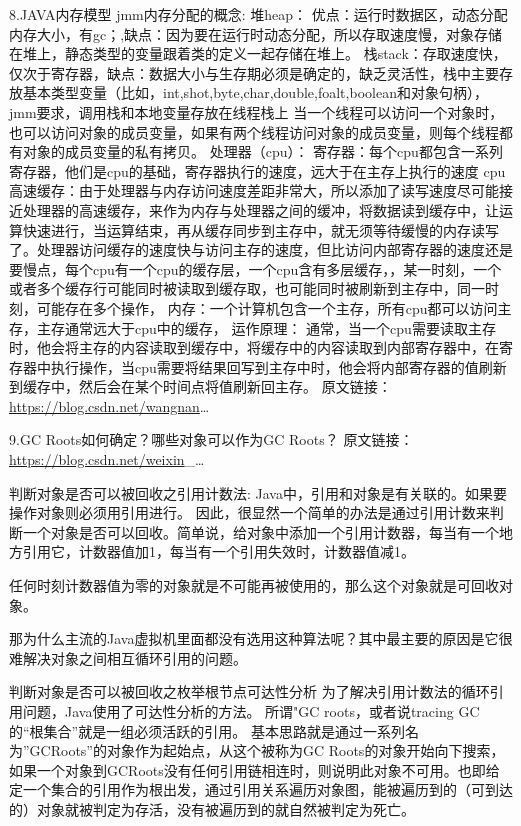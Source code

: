 \documentclass[9pt, b5paper]{article}
\begin{document}
8.JAVA内存模型
jmm内存分配的概念:
堆heap： 优点：运行时数据区，动态分配内存大小，有gc；,缺点：因为要在运行时动态分配，所以存取速度慢，对象存储在堆上，静态类型的变量跟着类的定义一起存储在堆上。
栈stack：存取速度快，仅次于寄存器，缺点：数据大小与生存期必须是确定的，缺乏灵活性，栈中主要存放基本类型变量（比如，int,shot,byte,char,double,foalt,boolean和对象句柄），jmm要求，调用栈和本地变量存放在线程栈上
当一个线程可以访问一个对象时，也可以访问对象的成员变量，如果有两个线程访问对象的成员变量，则每个线程都有对象的成员变量的私有拷贝。
处理器（cpu）： 寄存器：每个cpu都包含一系列寄存器，他们是cpu的基础，寄存器执行的速度，远大于在主存上执行的速度
cpu高速缓存：由于处理器与内存访问速度差距非常大，所以添加了读写速度尽可能接近处理器的高速缓存，来作为内存与处理器之间的缓冲，将数据读到缓存中，让运算快速进行，当运算结束，再从缓存同步到主存中，就无须等待缓慢的内存读写了。处理器访问缓存的速度快与访问主存的速度，但比访问内部寄存器的速度还是要慢点，每个cpu有一个cpu的缓存层，一个cpu含有多层缓存，，某一时刻，一个或者多个缓存行可能同时被读取到缓存取，也可能同时被刷新到主存中，同一时刻，可能存在多个操作，
内存：一个计算机包含一个主存，所有cpu都可以访问主存，主存通常远大于cpu中的缓存，
运作原理： 通常，当一个cpu需要读取主存时，他会将主存的内容读取到缓存中，将缓存中的内容读取到内部寄存器中，在寄存器中执行操作，当cpu需要将结果回写到主存中时，他会将内部寄存器的值刷新到缓存中，然后会在某个时间点将值刷新回主存。
原文链接：\url{https://blog.csdn.net/wangnan}\ldots{}

9.GC Roots如何确定？哪些对象可以作为GC Roots？
原文链接：\url{https://blog.csdn.net/weixin}\_\ldots{}

判断对象是否可以被回收之引用计数法:
Java中，引用和对象是有关联的。如果要操作对象则必须用引用进行。
因此，很显然一个简单的办法是通过引用计数来判断一个对象是否可以回收。简单说，给对象中添加一个引用计数器，每当有一个地方引用它，计数器值加1，每当有一个引用失效时，计数器值减1。

任何时刻计数器值为零的对象就是不可能再被使用的，那么这个对象就是可回收对象。

那为什么主流的Java虚拟机里面都没有选用这种算法呢？其中最主要的原因是它很难解决对象之间相互循环引用的问题。

判断对象是否可以被回收之枚举根节点可达性分析
为了解决引用计数法的循环引用问题，Java使用了可达性分析的方法。
所谓"GC roots，或者说tracing GC的“根集合”就是一组必须活跃的引用。
基本思路就是通过一系列名为”GCRoots”的对象作为起始点，从这个被称为GC Roots的对象开始向下搜索，如果一个对象到GCRoots没有任何引用链相连时，则说明此对象不可用。也即给定一个集合的引用作为根出发，通过引用关系遍历对象图，能被遍历到的（可到达的）对象就被判定为存活，没有被遍历到的就自然被判定为死亡。
\end{document}
